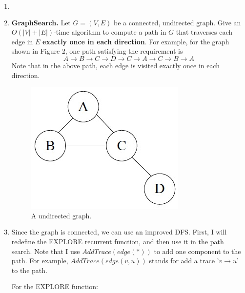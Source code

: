 \documentclass[12pt,a4paper]{article}
\makeatletter
\newtheorem*{solution}{Solution}
\theoremstyle{definition}
\renewenvironment{solution}[1][Solution] {\par\pushQED{\qed}\normalfont\topsep6\p@\@plus6\p@\relax\trivlist\item[\hskip\labelsep\bfseries#1\@addpunct{.}]\ignorespaces}{\popQED\endtrivlist\@endpefalse} \makeatother
\makeatother
\begin{document}
\begin{enumerate}
\begin{solution}
\begin{minipage}[t]{0.9\textwidth}
\begin{algorithm}[H]
    \;
\end{algorithm}
\end{minipage}

\end{solution}

\item \textbf{GraphSearch.} Let $G=(V,E)$ be a connected, undirected graph. Give an $O(|V|+|E|)$-time algorithm to compute a path in $G$ that traverses each edge in $E$ \textbf{exactly once in each direction}. For example, for the graph shown in Figure 2, one path satisfying the requirement is
$$A \rightarrow B \rightarrow C \rightarrow D \rightarrow C \rightarrow A \rightarrow C \rightarrow B \rightarrow A$$
Note that in the above path, each edge is visited exactly once in each direction.

\begin{figure}[h]
 \centering
 \includegraphics[scale=0.35]{Lab08-figure2.jpg}
 \caption{A undirected graph.}
\end{figure}

\begin{solution}
Since the graph is connected, we can use an improved DFS. First, I will redefine the EXPLORE recurrent function, and then use it in the path search. Note that I use $AddTrace(edge(*))$ to add one component to the path. For example, $AddTrace(edge(v,u))$ stands for add a trace '$v \rightarrow u$' to the path.

For the EXPLORE function:


\end{solution}
\end{enumerate}
\end{document}
